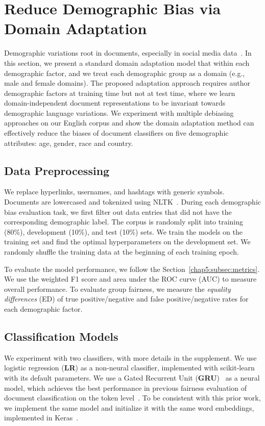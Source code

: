 \section{Reduce Demographic Bias via Domain Adaptation}
\label{chap5:sec:adaptation}

Demographic variations root in documents, especially in social media data~\cite{volkova2013exploring, hovy2015demographic}.
In this section, we present a standard domain adaptation model that within each demographic factor, and we treat each demographic group as a domain (e.g., male and female domains).
The proposed adaptation approach requires author demographic factors at training time but not at test time, where we learn domain-independent document representations to be invariant towards demographic language variations.
We experiment with multiple debiasing approaches on our English corpus and show the domain adaptation method can effectively reduce the biases of document classifiers on five demographic attributes: age, gender, race and country.

\subsection{Data Preprocessing}
We replace hyperlinks, usernames, and hashtags with generic symbols. Documents are lowercased and tokenized using NLTK~\cite{bird2004nltk}. 
During each demographic bias evaluation task, we first filter out data entries that did not have the corresponding demographic label.
The corpus is randomly split into training (80\%), development (10\%), and test (10\%) sets. 
We train the models on the training set and find the optimal hyperparameters on the development set. 
We randomly shuffle the training data at the beginning of each training epoch. 

To evaluate the model performance, we follow the Section~\ref{chap5:subsec:metrics}.
We use the weighted F1 score and area under the ROC curve (AUC) to measure overall performance.
To evaluate {group fairness},
we measure the \textit{equality differences} (ED) of true positive/negative and false positive/negative rates for each demographic factor.


\subsection{Classification Models}

We experiment with two classifiers, with more details in the supplement.
We use logistic regression (\textbf{LR}) as a non-neural classifier,
implemented with scikit-learn~\cite{pedregosa2011scikit} with its default parameters.
We use a Gated Recurrent Unit (\textbf{GRU})~\cite{chung2014empirical} as a neural model, which achieves the best performance in previous fairness evaluation of document classification on the token level~\cite{park2018reducing}. 
To be consistent with this prior work, we implement the same model and initialize it with the same word embeddings, implemented in Keras~\cite{chollet2015keras}.


